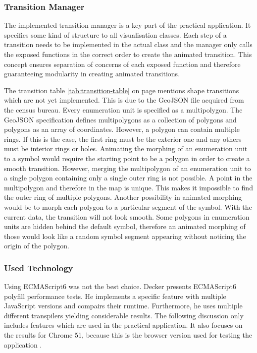 \newpage
\subsubsection{Transition Manager}
The implemented transition manager is a key part of the practical application. It specifies some kind of structure to all visualisation classes. Each step of a transition needs to be implemented in the actual class and the manager only calls the exposed functions in the correct order to create the animated transition. This concept ensures separation of concerns of each exposed function and therefore guaranteeing modularity in creating animated transitions.

The transition table \ref{tab:transition-table} on page \pageref{tab:transition-table} mentions shape transitions which are not yet implemented. This is due to the GeoJSON file acquired from the census bureau. Every enumeration unit is specified as a multipolygon. The GeoJSON specification defines multipolygons as a collection of polygons and polygons as an array of coordinates. However, a polygon can contain multiple rings. If this is the case, the first ring must be the exterior one and any others must be interior rings or holes.
Animating the morphing of an enumeration unit to a symbol would require the starting point to be a polygon in order to create a smooth transition. However, merging the multipolygon of an enumeration unit to a single polygon containing only a single outer ring is not possible. A point in the multipolygon and therefore in the map is unique. This makes it impossible to find the outer ring of multiple polygons.
Another possibility in animated morphing would be to morph each polygon to a particular segment of the symbol. With the current data, the transition will not look smooth. Some polygons in enumeration units are hidden behind the default symbol, therefore an animated morphing of those would look like a random symbol segment appearing without noticing the origin of the polygon.


\subsubsection{Used Technology}
Using ECMAScript6 was not the best choice. Decker presents ECMAScript6 polyfill performance tests. He implements a specific feature with multiple JavaScript versions and compairs their runtime. Furthermore, he uses multiple different transpilers yielding considerable results. The following discussion only includes features which are used in the practical application. It also focuses on the results for Chrome 51, because this is the browser version used for testing the application .

